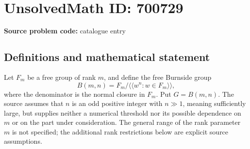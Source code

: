 \documentclass[11pt]{article}
\begin{document}
\section*{UnsolvedMath ID: 700729}
\textbf{Source problem code:} catalogue entry
\subsection{Definitions and mathematical statement}
Let \(F_m\) be a free group of rank \(m\), and define the free Burnside group
\[
B(m,n)=F_m/\langle\!\langle w^n:w\in F_m\rangle\!\rangle,
\]
where the denominator is the normal closure in \(F_m\). Put \(G=B(m,n)\). The source assumes that \(n\) is an odd positive integer with \(n\gg1\), meaning sufficiently large, but supplies neither a numerical threshold nor its possible dependence on \(m\) or on the part under consideration. The general range of the rank parameter \(m\) is not specified; the additional rank restrictions below are explicit source assumptions.
\end{document}
